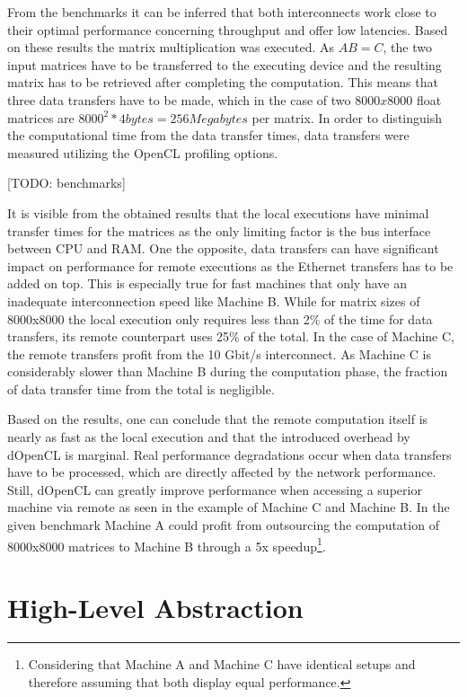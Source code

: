 From the benchmarks it can be inferred that both interconnects work close to their optimal performance concerning throughput and offer low latencies. Based on these results the matrix multiplication was executed. As $AB = C$, the two input matrices have to be transferred to the executing device and the resulting matrix has to be retrieved after completing the computation. This means that three data transfers have to be made, which in the case of two $8000x8000$ float matrices are $8000^2 * 4 bytes = 256 Megabytes$ per matrix. In order to distinguish the computational time from the data transfer times, data transfers were measured utilizing the OpenCL profiling options.

[TODO: benchmarks]

It is visible from the obtained results that the local executions have minimal transfer times for the matrices as the only limiting factor is the bus interface between CPU and RAM. One the opposite, data transfers can have significant impact on performance for remote executions as the Ethernet transfers has to be added on top. This is especially true for fast machines that only have an inadequate interconnection speed like Machine B. While for matrix sizes of 8000x8000 the local execution only requires less than 2\% of the time for data transfers, its remote counterpart uses 25\% of the total. In the case of Machine C, the remote transfers profit from the 10 Gbit/s interconnect. As Machine C is considerably slower than Machine B during the computation phase, the fraction of data transfer time from the total is negligible.

Based on the results, one can conclude that the remote computation itself is nearly as fast as the local execution and that the introduced overhead by dOpenCL is marginal. Real performance degradations occur when data transfers have to be processed, which are directly affected by the network performance. Still, dOpenCL can greatly improve performance when accessing a superior machine via remote as seen in the example of Machine C and Machine B. In the given benchmark Machine A could profit from outsourcing the computation of 8000x8000 matrices to Machine B through a 5x speedup\footnote{Considering that Machine A and Machine C have identical setups and therefore assuming that both display equal performance.}.

\section{High-Level Abstraction}
\label{abstraction}

